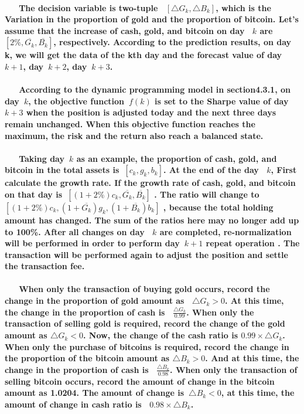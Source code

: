 \documentclass{mcmthesis}
\begin{document}
	\paragraph{
		\ \ \ The decision variable is two-tuple \ $ [\bigtriangleup G_{k}, \bigtriangleup B_{k}] $, which is the Variation in the proportion of gold and the proportion of bitcoin. Let’s assume that the increase of cash, gold, and bitcoin on day \ $ k $ are \ $ [2\%, \overline{G_{k}}, \overline{B_{k}} ]$, respectively. According to the prediction results, on day k, we will get the data of the kth day and the forecast value of day\ $ k+1$, day\ $ k+2$, day\ $ k+3$.
	}
	
	\paragraph{
		\ \ \ According to the dynamic programming model in section4.3.1, on day\ $k$, the objective function\ $f(k)$ is set to the Sharpe value of day\ $k+3$ when the position is adjusted today and the next three days remain unchanged. When this objective function reaches the maximum, the risk and the return also reach a balanced state.
	}
	
	\paragraph{
		\ \ \ Taking day\ $k$ as an example, the proportion of cash, gold, and bitcoin in the total assets is\ $[c_{k}, g_{k}, b_{k}]$. At the end of the day \ $k$, First calculate the growth rate. If the growth rate of cash, gold, and bitcoin on that day is\ $[(1+2\%)c_{k}, \overline{G_{k}}, \overline{B_{k}}]$ . The ratio will change to\ $[(1+2\%)c_{k}, (1+\overline{G_{k}})g_{k}, (1+\overline{B_{k}})b_{k}]$ , because the total holding amount has changed. The sum of the ratios here may no longer add up to 100\%. After all changes on day \ $k$ are completed, re-normalization will be performed in order to perform day\ $k+1$ repeat operation . The transaction will be performed again to adjust the position and settle the transaction fee.
	}
	
	\paragraph{
		\ \ \ When only the transaction of buying gold occurs, record the change in the proportion of gold amount as \ $\bigtriangleup G_{k} > 0$. At this time, the change in the proportion of cash is \ $ \frac{\bigtriangleup G_{k}}{0.99}$. When only the transaction of selling gold is required, record the change of the gold amount as  $\bigtriangleup G_{k} < 0$. Now, the change of the cash ratio is $0.99 \times \bigtriangleup G_{k} $. When only the purchase of bitcoins is required, record the change in the proportion of the bitcoin amount as $\bigtriangleup B_{k} > 0$. And at this time, the change in the proportion of cash is \ $ \frac{\bigtriangleup B_{k}}{0.98}$. When only the transaction of selling bitcoin occurs, record the amount of change in the bitcoin amount as 1.0204. The amount of change is\ $\bigtriangleup B_{k} < 0$, at this time, the amount of change in cash ratio is \ $0.98\times \bigtriangleup B_{k}$.
	}
	
\end{document}
